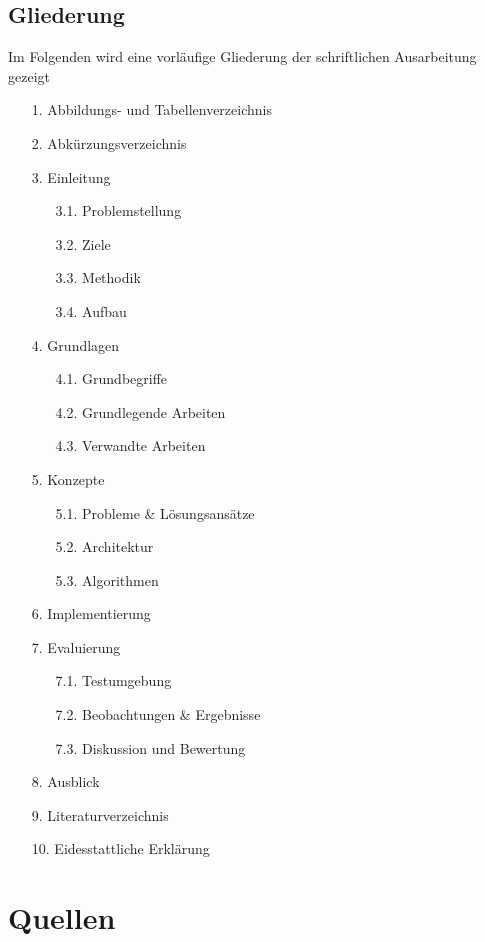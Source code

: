 \documentclass[11pt]{article}
\begin{document}
    \subsection{Gliederung}
    Im Folgenden wird eine vorläufige Gliederung der schriftlichen Ausarbeitung gezeigt
    \begin{itemize}
        \item[1.] Abbildungs- und Tabellenverzeichnis
        \item[2.] Abkürzungsverzeichnis
        \item[3.] Einleitung
        \begin{itemize}
            \item[3.1.] Problemstellung
            \item[3.2.] Ziele
            \item[3.3.] Methodik
            \item[3.4.] Aufbau
        \end{itemize}
        \item[4.] Grundlagen
        \begin{itemize}
            \item[4.1.] Grundbegriffe
            \item[4.2.] Grundlegende Arbeiten
            \item[4.3.] Verwandte Arbeiten
        \end{itemize}
        \item[5.] Konzepte
        \begin{itemize}
            \item[5.1.] Probleme \& Lösungsansätze
            \item[5.2.] Architektur
            \item[5.3.] Algorithmen
        \end{itemize}
        \item[6.] Implementierung
        \item[7.] Evaluierung
        \begin{itemize}
            \item[7.1.] Testumgebung
            \item[7.2.] Beobachtungen \& Ergebnisse
            \item[7.3.] Diskussion und Bewertung
        \end{itemize}
        \item[8.] Ausblick
        \item[9.] Literaturverzeichnis
        \item[10.] Eidesstattliche Erklärung
    \end{itemize}

    \section{Quellen}

    ~\nocite{*}
    
    
\end{document}
